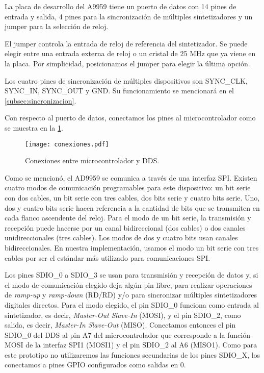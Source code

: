 \documentclass{article}
\newenvironment{standalone}{\begin{preview}}{\end{preview}}
\begin{document}
\begin{standalone}
  La placa de desarrollo del A9959 tiene un puerto de datos con 14 pines de entrada y salida, 4 pines para la sincronización de múltiples sintetizadores y un jumper para la selección de reloj.

  El jumper controla la entrada de reloj de referencia del sintetizador.
  Se puede elegir entre una entrada externa de reloj o un cristal de 25 MHz que ya viene en la placa.
  Por simplicidad, posicionamos el jumper para elegir la última opción.

  Los cuatro pines de sincronización de múltiples dispositivos son SYNC\_CLK, SYNC\_IN, SYNC\_OUT y GND.
  Su funcionamiento se mencionará en el \cref{subsec:sincronizacion}.

  Con respecto al puerto de datos, conectamos los pines al microcontrolador como se muestra en la \cref{fig:conexiones}.

  \begin{figure}[!htbp]
    \centering
    \texttt{[image: conexiones.pdf]}
    \caption{Conexiones entre microcontrolador y DDS.}
    \label{fig:conexiones}
  \end{figure}

  Como se mencionó, el AD9959 se comunica a través de una interfaz SPI.
  Existen cuatro modos de comunicación programables para este dispositivo: un bit serie con dos cables, un bit serie con tres cables, dos bits serie y cuatro bits serie.
  Uno, dos y cuatro bits serie hacen referencia a la cantidad de bits que se transmiten en cada flanco ascendente del reloj.
  Para el modo de un bit serie, la transmisión y recepción puede hacerse por un canal bidireccional (dos cables) o dos canales unidireccionales (tres cables).
  Los modos de dos y cuatro bits usan canales bidireccionales.
  En nuestra implementación, usamos el modo un bit serie con tres cables por ser el estándar más utilizado para comunicaciones SPI.

  Los pines SDIO\_0 a SDIO\_3 se usan para transmisión y recepción de datos y, si el modo de comunicación elegido deja algún pin libre, para realizar operaciones de \textit{ramp-up} y \textit{ramp-down} (RD/RD) y/o para sincronizar múltiples sintetizadores digitales directos.
  Para el modo elegido, el pin SDIO\_0 funciona como entrada al sintetizador, es decir, \textit{Master-Out Slave-In} (MOSI), y el pin SDIO\_2, como salida, es decir, \textit{Master-In Slave-Out} (MISO).
  Conectamos entonces el pin SDIO\_0 del DDS al pin A7 del microcontrolador que corresponde a la función MOSI de la interfaz SPI1 (MOSI1) y el pin SDIO\_2 al A6 (MISO1).
  Como para este prototipo no utilizaremos las funciones secundarias de los pines SDIO\_X, los conectamos a pines GPIO configurados como salidas en 0.


\end{standalone}
\end{document}
